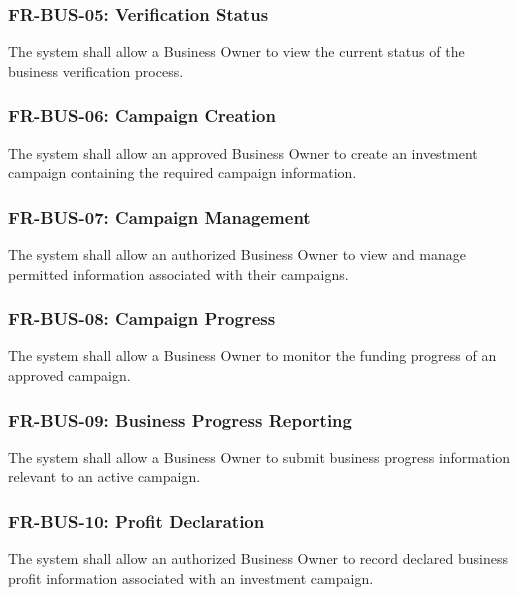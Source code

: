 \subsubsection{FR-BUS-05: Verification Status}

The system shall allow a Business Owner to view the current status of the
business verification process.

\subsubsection{FR-BUS-06: Campaign Creation}

The system shall allow an approved Business Owner to create an investment
campaign containing the required campaign information.

\subsubsection{FR-BUS-07: Campaign Management}

The system shall allow an authorized Business Owner to view and manage
permitted information associated with their campaigns.

\subsubsection{FR-BUS-08: Campaign Progress}

The system shall allow a Business Owner to monitor the funding progress of
an approved campaign.

\subsubsection{FR-BUS-09: Business Progress Reporting}

The system shall allow a Business Owner to submit business progress
information relevant to an active campaign.

\subsubsection{FR-BUS-10: Profit Declaration}

The system shall allow an authorized Business Owner to record declared
business profit information associated with an investment campaign.



